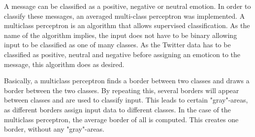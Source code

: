 
A message can be classified as a positive, negative or neutral emotion. In order to classify these messages, an averaged multi-class perceptron was implemented. A multiclass perceptron is an algorithm that allows supervised classification. As the name of the algorithm implies, the input does not have to be binary allowing input to be classified as one of many classes. As the Twitter data has to be classified as positive, neutral and negative before assigning an emoticon to the message, this algorithm does as desired. 

Basically, a multiclass perceptron finds a border between two classes and draws a border between the two classes. By repeating this, several borders will appear between classes and are used to classify input. This leads to certain "gray"-areas, as different borders assign input data to different classes. In the case of the multiclass perceptron, the average border of all is computed. This creates one border, without any "gray"-areas.
